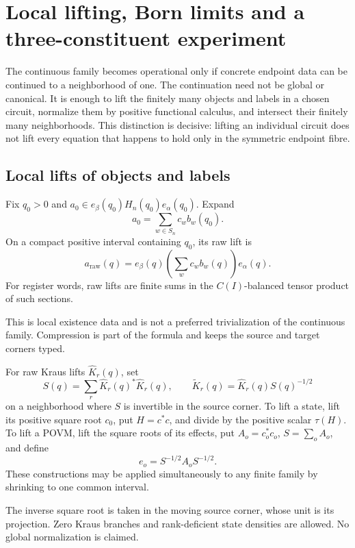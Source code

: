 \clearpage
\section{Local lifting, Born limits and a three-constituent experiment}
\label{sec:f1-limit-experiments}

The continuous family becomes operational only if concrete endpoint data can
be continued to a neighborhood of one.  The continuation need not be global
or canonical.  It is enough to lift the finitely many objects and labels in a
chosen circuit, normalize them by positive functional calculus, and intersect
their finitely many neighborhoods.  This distinction is decisive: lifting an
individual circuit does not lift every equation that happens to hold only in
the symmetric endpoint fibre.

\subsection{Local lifts of objects and labels}

\begin{definition}
Fix $q_0>0$ and
$a_0\in e_\beta(q_0)H_n(q_0)e_\alpha(q_0)$.  Expand
\[
 a_0=\sum_{w\in S_n}c_w b_w(q_0).
\]
On a compact positive interval containing $q_0$, its raw lift is
\[
 a_{\mathrm{raw}}(q)=e_\beta(q)
       \left(\sum_wc_wb_w(q)\right)e_\alpha(q).
\]
For register words, raw lifts are finite sums in the $C(I)$-balanced tensor
product of such sections.
\end{definition}
\begin{scope}
This is local existence data and is not a preferred trivialization of the
continuous family.  Compression is part of the formula and keeps the source
and target corners typed.
\end{scope}

\begin{definition}
For raw Kraus lifts $\widehat K_r(q)$, set
\[
 S(q)=\sum_r\widehat K_r(q)^*\widehat K_r(q),\qquad
 \widetilde K_r(q)=\widehat K_r(q)S(q)^{-1/2}
\]
on a neighborhood where $S$ is invertible in the source corner.  To lift a
state, lift its positive square root $c_0$, put $H=c^*c$, and divide by the
positive scalar $\tau(H)$.  To lift a POVM, lift the square roots of its
effects, put $A_o=c_o^*c_o$, $S=\sum_oA_o$, and define
\[
 e_o=S^{-1/2}A_oS^{-1/2}.
\]
These constructions may be applied simultaneously to any finite family by
shrinking to one common interval.
\end{definition}
\begin{scope}
The inverse square root is taken in the moving source corner, whose unit is
its projection.  Zero Kraus branches and rank-deficient state densities are
allowed.  No global normalization is claimed.
\end{scope}

